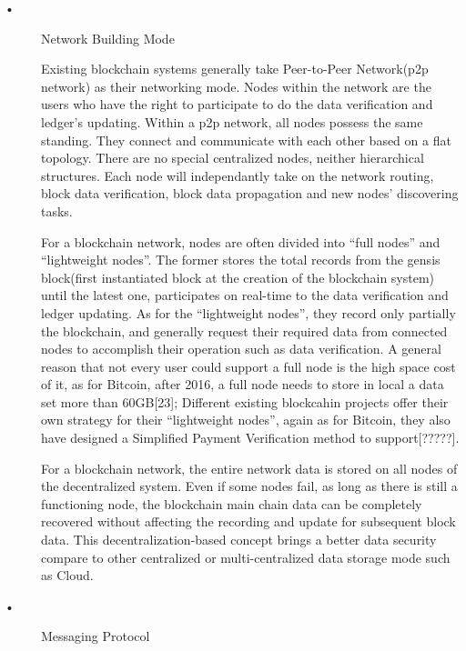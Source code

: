 \documentclass[doublespacing]{bmcart}
\begin{document}
\begin{CJK*}{UTF8}{gbsn}
\begin{description}
\item[•] Network Building Mode

  Existing blockchain systems generally take Peer-to-Peer Network(p2p network) as their networking mode. Nodes within the network are the users who have the right to participate to do the data verification and ledger's updating.
 Within a p2p network, all nodes possess the same standing. They connect and communicate with each other based on a flat topology. There are no special centralized nodes, neither hierarchical structures. Each node will independantly take on the network routing, block data verification, block data propagation and new nodes' discovering tasks.
 
  For a blockchain network, nodes are often divided into ``full nodes'' and ``lightweight nodes''. The former stores the total records from the gensis block(first instantiated block at the creation of the blockchain system) until the latest one, participates on real-time to the data verification and ledger updating. As for the ``lightweight nodes'', they record only partially the blockchain, and generally request their required data from connected nodes to accomplish their operation such as data verification. 
 A general reason that not every user could support a full node is the high space cost of it, as for Bitcoin, after 2016, a full node needs to store in local a data set more than 60GB[23]; Different existing blockcahin projects offer their own strategy for their ``lightweight nodes'', again as for Bitcoin, they also have designed a Simplified Payment Verification method to support[?????].
 
 	For a blockchain network, the entire network data is stored on all nodes of the decentralized system. Even if some nodes fail, as long as there is still a functioning node, the blockchain main chain data can be completely recovered without affecting the recording and update for subsequent block data. This decentralization-based concept brings a better data security compare to other centralized or multi-centralized data storage mode such as Cloud.
 
\item[•] Messaging Protocol


\end{description}
\end{CJK*}
\end{document}
